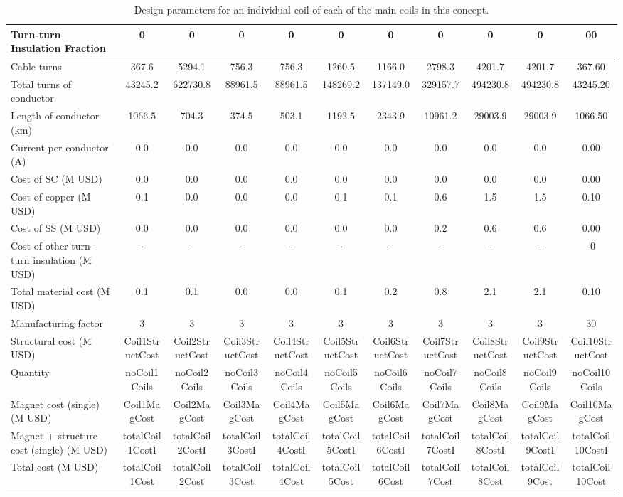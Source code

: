 \begin{table}[h]
{\begin{tabular}{lcccccccccc}
Turn-turn Insulation Fraction & 0 & 0 & 0 & 0 & 0 & 0 & 0 & 0 & 0 & 00 \\
\hline
Cable turns & 367.6 & 5294.1 & 756.3 & 756.3 & 1260.5 & 1166.0 & 2798.3 & 4201.7 & 4201.7 & 367.60 \\
Total turns of conductor & 43245.2 & 622730.8 & 88961.5 & 88961.5 & 148269.2 & 137149.0 & 329157.7 & 494230.8 & 494230.8 & 43245.20 \\
Length of conductor (km) & 1066.5 & 704.3 & 374.5 & 503.1 & 1192.5 & 2343.9 & 10961.2 & 29003.9 & 29003.9 & 1066.50 \\
Current per conductor (A) & 0.0 & 0.0 & 0.0 & 0.0 & 0.0 & 0.0 & 0.0 & 0.0 & 0.0 & 0.00 \\
\hline
Cost of SC (M USD) & 0.0 & 0.0 & 0.0 & 0.0 & 0.0 & 0.0 & 0.0 & 0.0 & 0.0 & 0.00 \\
Cost of copper (M USD) & 0.1 & 0.0 & 0.0 & 0.0 & 0.1 & 0.1 & 0.6 & 1.5 & 1.5 & 0.10 \\
Cost of SS (M USD) & 0.0 & 0.0 & 0.0 & 0.0 & 0.0 & 0.0 & 0.2 & 0.6 & 0.6 & 0.00 \\
Cost of other turn-turn insulation (M USD) & - & - & - & - & - & - & - & - & - & -0 \\
Total material cost (M USD) & 0.1 & 0.1 & 0.0 & 0.0 & 0.1 & 0.2 & 0.8 & 2.1 & 2.1 & 0.10 \\
Manufacturing factor & 3 & 3 & 3 & 3 & 3 & 3 & 3 & 3 & 3 & 30 \\
Structural cost (M USD) & Coil1StructCost & Coil2StructCost & Coil3StructCost & Coil4StructCost & Coil5StructCost & Coil6StructCost & Coil7StructCost & Coil8StructCost & Coil9StructCost & Coil10StructCost \\
Quantity & noCoil1Coils & noCoil2Coils & noCoil3Coils & noCoil4Coils & noCoil5Coils & noCoil6Coils & noCoil7Coils & noCoil8Coils & noCoil9Coils & noCoil10Coils \\
Magnet cost (single)(M USD) & Coil1MagCost & Coil2MagCost & Coil3MagCost & Coil4MagCost & Coil5MagCost & Coil6MagCost & Coil7MagCost & Coil8MagCost & Coil9MagCost & Coil10MagCost \\
Magnet + structure cost (single) (M USD) & totalCoil1CostI & totalCoil2CostI & totalCoil3CostI & totalCoil4CostI & totalCoil5CostI & totalCoil6CostI & totalCoil7CostI & totalCoil8CostI & totalCoil9CostI & totalCoil10CostI \\
\hline
Total cost (M USD) & totalCoil1Cost & totalCoil2Cost & totalCoil3Cost & totalCoil4Cost & totalCoil5Cost & totalCoil6Cost & totalCoil7Cost & totalCoil8Cost & totalCoil9Cost & totalCoil10Cost \\
\hline
\end{tabular}}
\caption{Design parameters for an individual coil of each of the main coils in this concept.}
\label{your-table-label}
\end{table}


